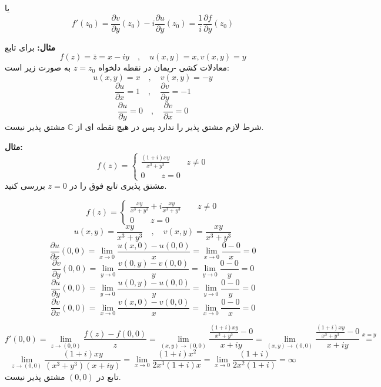 \documentclass[12pt]{report}
\begin{document}
 	 	 	  یا
 	 	 	  $$f'(z_0) = \frac{\partial v}{\partial y}(z_0) - i\frac{\partial u}{\partial y}(z_0) = \frac{1}{i}\frac{\partial f}{\partial y}(z_0)$$
 	 	 	  
 	 	 	  \textbf{مثال:}
 	 	 	  برای تابع
 	 	 	  $$f(z) = \bar{z} = x - iy \quad, \quad u(x, y) = x , v(x, y) = y$$
 	 	 	  معادلات  کشی -ریمان در نقطه دلخواه 
 	 	 	  $z=z_0$
 	 	 	  به صورت زیر است:
 	 	 	  $$u(x, y) = x \quad,\quad v(x, y) = -y$$
 	 	 	  $$\frac{\partial u}{\partial x}=1 \quad, \quad\frac{\partial v}{\partial y} = -1$$
 	 	 	  $$\frac{\partial u}{\partial y} = 0\quad , \quad \frac{\partial v}{\partial x} = 0$$
 	 	 	  شرط لازم مشتق پذیر را ندارد پس در هیچ نقطه ای از 
 	 	 	  $\mathbb{C}$
 	 	 	  مشتق پذیر نیست.
 	 	 	  \newline
 	 	 	  
 	 	 	  \textbf{مثال:}
 	 	 	  \[
 	 	 	  f(z) = 
 	 	 	  \begin{cases}
 	 	 	  	\frac{(1+i)xy}{x^3+y^3} \qquad z \neq 0\\
 	 	 	  	0 \qquad z = 0
 	 	 	  \end{cases}
 	 	 	  \]
 	 	 	  مشتق پذیری تابع فوق را در 
 	 	 	  $z=0$
 	 	 	  بررسی کنید.
 	 	 	  
 	 	 	  \[
 	 	 	  f(z) = 
 	 	 	  \begin{cases}
 	 	 	  	\frac{xy}{x^3+y^3} + i \frac{xy}{x^3+y^3} \qquad z \neq 0\\
 	 	 	  	0 \qquad z = 0
 	 	 	  \end{cases}
 	 	 	  \]
 	 	 	  $$u(x, y) = \frac{xy}{x^3+y^3} \quad , \quad v(x, y) = \frac{xy}{x^3+y^3}$$
 	 	 	  $$\frac{\partial u}{\partial x}(0, 0) = \lim_{x \to 0} \frac{u(x, 0) - u(0,0)}{x} = \lim_{x \to 0} \frac{0 - 0}{x} = 0$$
 	 	 	  $$\frac{\partial v}{\partial y}(0, 0) = \lim_{y \to 0} \frac{v(0, y) - v(0,0)}{y} = \lim_{y \to 0} \frac{0 - 0}{y} = 0$$
 	 	 	  $$\frac{\partial u}{\partial y}(0, 0) = \lim_{y \to 0} \frac{u(0, y) - u(0,0)}{y} = \lim_{y \to 0} \frac{0 - 0}{y} = 0$$
 	 	 	  $$\frac{\partial v}{\partial x}(0, 0) = \lim_{x \to 0} \frac{v(x, 0) - v(0,0)}{x} = \lim_{x \to 0} \frac{0 - 0}{x} = 0$$
 	 	 	  
 	 	 	  $$f'(0,0) = \lim_{z \to (0,0)} \frac{f(z) - f(0, 0)}{z} = \lim_{(x, y) \to (0, 0)} \frac{\frac{(1+i)xy}{x^3+y^3} - 0}{x+iy} = \lim_{(x, y) \to (0, 0)} \frac{\frac{(1+i)xy}{x^3+y^3} - 0}{x+iy} \overset{x=y}{=}$$
 	 	 	  $$\lim_{z \to (0,0)} \frac{(1+i)xy}{(x^3+y^3)(x+iy)} = \lim_{x \to 0} \frac{(1 + i) x^2}{2x^3(1+i)x} = \lim_{x \to 0} \frac{(1+i)}{2x^2(1+i)} = \infty$$
 	 	 	  تابع در 
 	 	 	  $(0,0)$
 	 	 	  مشتق پذیر نیست.
 	 	 	  
\end{document}
